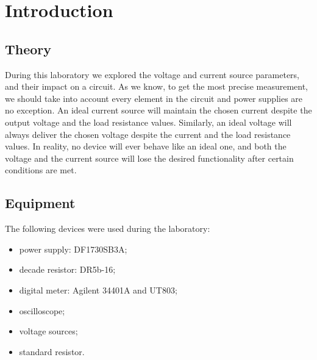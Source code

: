 \section{Introduction}

\subsection{Theory}

During this laboratory we explored the voltage and current source parameters, and their impact on a circuit. As we know, to get the most precise measurement, we should take into account every element in the circuit and power supplies are no exception. An ideal current source will maintain the chosen current despite the output voltage and the load resistance values.
Similarly, an ideal voltage will always deliver the chosen voltage despite the current and the load resistance values. In reality, no device will ever behave like an ideal one, and both the voltage and the current source will lose the desired functionality after certain conditions are met.

\subsection{Equipment}

The following devices were used during the laboratory:

\begin{itemize}
	\item power supply: DF1730SB3A;
	\item decade resistor: DR5b-16;
	\item digital meter:  Agilent 34401A and UT803;
	\item oscilloscope;
	\item voltage sources;
	\item standard resistor.
\end{itemize}